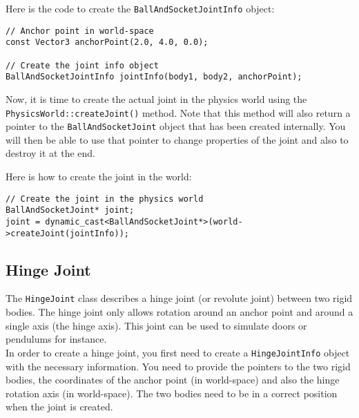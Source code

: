 \documentclass[a4paper,12pt]{article}
\begin{document}
    Here is the code to create the \texttt{BallAndSocketJointInfo} object: \\

    \begin{lstlisting}
// Anchor point in world-space
const Vector3 anchorPoint(2.0, 4.0, 0.0);

// Create the joint info object
BallAndSocketJointInfo jointInfo(body1, body2, anchorPoint);
  \end{lstlisting}

    \vspace{0.6cm}

    \begin{sloppypar}
    Now, it is time to create the actual joint in the physics world using the \texttt{PhysicsWorld::createJoint()} method.
    Note that this method will also return a pointer to the \texttt{BallAndSocketJoint} object that has been created internally. You will then
    be able to use that pointer to change properties of the joint and also to destroy it at the end. \\
    \end{sloppypar}

    Here is how to create the joint in the world: \\

    \begin{lstlisting}
// Create the joint in the physics world
BallAndSocketJoint* joint;
joint = dynamic_cast<BallAndSocketJoint*>(world->createJoint(jointInfo));
  \end{lstlisting}

    \vspace{0.6cm}

    \subsection{Hinge Joint}

    The \texttt{HingeJoint} class describes a hinge joint (or revolute joint) between two rigid bodies. The hinge joint only allows rotation around an
    anchor point and around a single axis (the hinge axis). This joint can be used to simulate doors or pendulums for instance. \\

    In order to create a hinge joint, you first need to create a \texttt{HingeJointInfo} object with the necessary information. You need to provide
    the pointers to the two rigid bodies, the coordinates of the anchor point (in world-space) and also the hinge rotation axis (in world-space). The
    two bodies need to be in a correct position when the joint is created. \\
\end{document}
